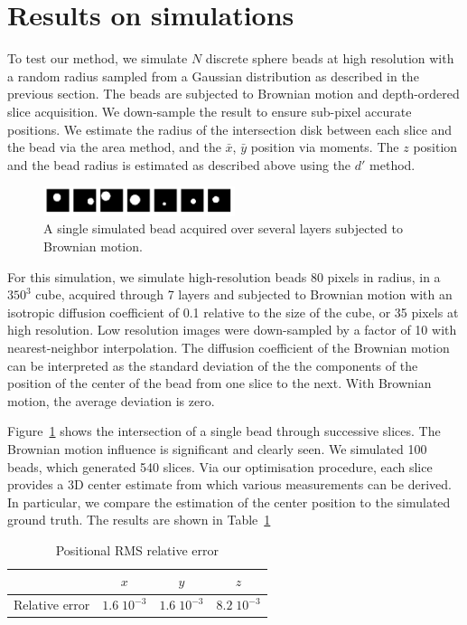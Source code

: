 \documentclass{llncs}
\begin{document}
\section{Results on simulations}
To test our method, we simulate $N$ discrete sphere beads at high resolution with a random radius sampled from a Gaussian distribution as described in the previous section. The beads are subjected to Brownian motion and depth-ordered slice acquisition. We down-sample the result to ensure sub-pixel accurate positions. We estimate the radius of the intersection disk between each slice and the bead via the area method, and the $\bar{x}$, $\bar{y}$ position via moments. 
The $z$ position and the bead radius is estimated as described above using the $d'$ method.

\begin{figure}
\centering
\includegraphics[width=0.5\textwidth]{images/simulated.png}
\caption{A single simulated bead acquired over several layers subjected to Brownian motion.}
\label{fig:simulated_beads}
\end{figure}

For this simulation, we simulate high-resolution beads 80 pixels in radius, in a $350^3$ cube, acquired through 7 layers and subjected to  Brownian motion with an isotropic diffusion coefficient of 0.1 relative to the size of the cube, or 35 pixels at high resolution. Low resolution images were down-sampled by a factor of 10 with nearest-neighbor interpolation. The diffusion coefficient of the Brownian motion can be interpreted as the standard deviation of the the components of the position of the center of the bead from one slice to the next. With Brownian motion, the average deviation is zero.

Figure~\ref{fig:simulated_beads} shows the intersection of a single bead through successive slices. The Brownian motion influence is significant and clearly seen. We simulated 100 beads, which generated 540 slices. Via our optimisation procedure, each slice provides a 3D center estimate from which various measurements can be derived. In particular, we compare the estimation of the center position to the simulated ground truth. The results are shown in Table~\ref{tab:rel_error}

\begin{table}[htb]
\centering
\caption{Positional RMS relative error}
\begin{tabular}{|c|c|c|c|}\hline
                & $x$            & $y$            & $z$ \\\hline
Relative error  & $1.6\;10^{-3}$ & $1.6\;10^{-3}$ & $8.2\;10^{-3}$ \\\hline
\end{tabular}
\label{tab:rel_error}
\end{table}
\end{document}
